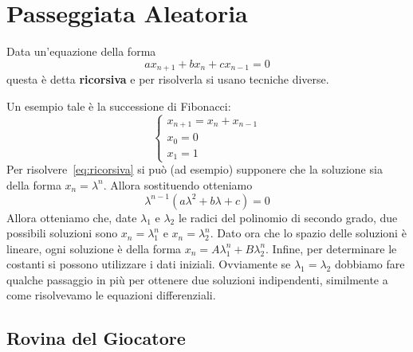 \section{Passeggiata Aleatoria}

Data un'equazione della forma
\begin{equation}\label{eq:ricorsiva}
  a x_{n+1} + b x_{n} + c x_{n-1} = 0 
\end{equation}
questa è detta \textbf{ricorsiva} e per risolverla si usano tecniche diverse.

Un esempio tale è la successione di Fibonacci:
\[
  \begin{cases}{}
      x_{n+1} = x_{n} + x_{n-1} \\
      x_{0} = 0 \\
      x_{1} = 1
  \end{cases}
\]
Per risolvere~\eqref{eq:ricorsiva} si può (ad esempio) supponere che la soluzione sia della forma
\(x_{n} = \lambda^{n}\). Allora sostituendo otteniamo
\[
  \lambda^{n-1} {\left( a \lambda^{2} + b \lambda + c \right)} = 0
\]
Allora otteniamo che, date \(\lambda_{1}\) e \(\lambda_{2}\) le radici del
polinomio di secondo grado, due possibili soluzioni sono \(x_{n} =
\lambda_{1}^{n}\) e \(x_{n} = \lambda_{2}^{n}\). Dato ora che lo spazio delle
soluzioni è lineare, ogni soluzione è della forma \(x_{n} = A \lambda_{1}^{n} +
B \lambda_{2}^{n}\). Infine, per determinare le costanti si possono utilizzare i
dati iniziali. Ovviamente se \(\lambda_{1} = \lambda_{2}\) dobbiamo fare qualche
passaggio in più per ottenere due soluzioni indipendenti, similmente a come
risolvevamo le equazioni differenziali.

\subsection{Rovina del Giocatore}

